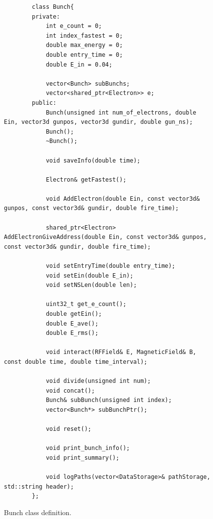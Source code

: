 \documentclass[a4paper,oneside,12pt]{report}
\numberwithin{equation}{chapter}
\begin{document}
\begin{figure}[H]
    \centering
    \begin{verbatim}
        class Bunch{
        private:
            int e_count = 0;
            int index_fastest = 0;
            double max_energy = 0;
            double entry_time = 0;
            double E_in = 0.04;

            vector<Bunch> subBunchs;
            vector<shared_ptr<Electron>> e;
        public:
            Bunch(unsigned int num_of_electrons, double Ein, vector3d gunpos, vector3d gundir, double gun_ns);
            Bunch();
            ~Bunch();

            void saveInfo(double time);

            Electron& getFastest();

            void AddElectron(double Ein, const vector3d& gunpos, const vector3d& gundir, double fire_time);

            shared_ptr<Electron> AddElectronGiveAddress(double Ein, const vector3d& gunpos, const vector3d& gundir, double fire_time);

            void setEntryTime(double entry_time);
            void setEin(double E_in);
            void setNSLen(double len);

            uint32_t get_e_count();
            double getEin();
            double E_ave();
            double E_rms();

            void interact(RFField& E, MagneticField& B, const double time, double time_interval);

            void divide(unsigned int num);
            void concat();
            Bunch& subBunch(unsigned int index);
            vector<Bunch*> subBunchPtr();

            void reset();

            void print_bunch_info();
            void print_summary();

            void logPaths(vector<DataStorage>& pathStorage, std::string header);
        };
    \end{verbatim}
    \vspace{20pt}
    \caption{Bunch class definition.}
    \label{fig:bunch_class}
\end{figure}
\end{document}
